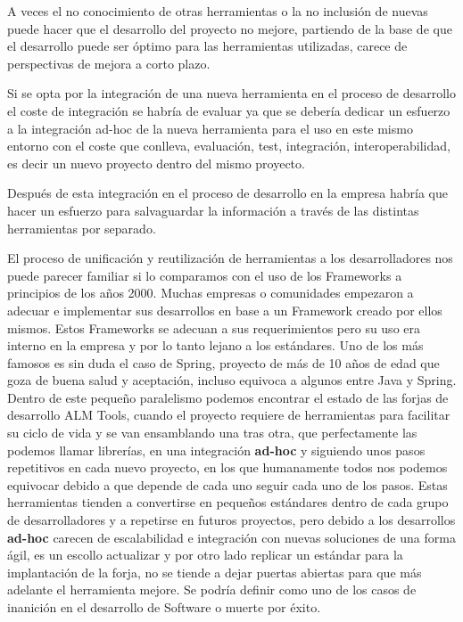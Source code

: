 \par A veces el no conocimiento de otras herramientas o la no inclusión de nuevas puede hacer que el desarrollo del proyecto no mejore, partiendo de la base de que el desarrollo puede ser óptimo para las herramientas utilizadas, carece de perspectivas de mejora a corto plazo.

\par Si se opta por la integración de una nueva herramienta en el proceso de desarrollo el coste de integración se habría de evaluar ya que se debería dedicar un esfuerzo a la integración ad-hoc de la nueva herramienta para el uso en este mismo entorno con el coste que conlleva, evaluación, test, integración, interoperabilidad, es decir un nuevo proyecto dentro del mismo proyecto.

\par Después de esta integración en el proceso de desarrollo en la empresa habría que hacer un esfuerzo para salvaguardar la información a través de las distintas herramientas por separado.

\par El proceso de unificación y reutilización de herramientas a los desarrolladores nos puede parecer familiar si lo comparamos con el uso de los Frameworks a principios de los años 2000. Muchas empresas o comunidades empezaron a adecuar e implementar sus desarrollos en base a un Framework creado por ellos mismos. Estos Frameworks se adecuan a sus requerimientos pero su uso era interno en la empresa y por lo tanto lejano a los estándares. Uno de los más famosos es sin duda el caso de Spring, proyecto de más de 10 años de edad que goza de buena salud y aceptación, incluso equivoca a algunos entre Java y Spring. Dentro de este pequeño paralelismo podemos encontrar el estado de las forjas de desarrollo ALM Tools, cuando el proyecto requiere de herramientas para facilitar su ciclo de vida y se van ensamblando una tras otra, que perfectamente las podemos llamar librerías, en una integración \textbf{ad-hoc} y siguiendo unos pasos repetitivos en cada nuevo proyecto, en los que humanamente todos nos podemos equivocar debido a que depende de cada uno seguir cada uno de los pasos. Estas herramientas tienden a convertirse en pequeños estándares dentro de cada grupo de desarrolladores y a repetirse en futuros proyectos, pero debido a los desarrollos \textbf{ad-hoc} carecen de escalabilidad e integración con nuevas soluciones de una forma ágil, es un escollo actualizar y por otro lado replicar un estándar para la implantación de la forja, no se tiende a dejar puertas abiertas para que más adelante el herramienta mejore. Se podría definir como uno de los casos de inanición en el desarrollo de Software o muerte por éxito.

